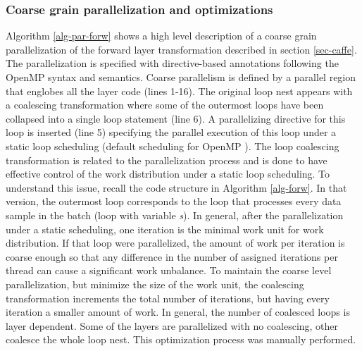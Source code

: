 \subsubsection{Coarse grain parallelization and optimizations}
Algorithm \ref{alg-par-forw} shows a high level description of a 
coarse grain parallelization of the forward layer transformation 
described in section \ref{sec-caffe}. The parallelization is specified 
with directive-based annotations following the OpenMP syntax and semantics. 
Coarse parallelism is defined by a parallel region that englobes all the 
layer code (lines 1-16). The original loop nest appears with a coalescing 
transformation where some of the outermost loops have been collapsed into a 
single loop statement (line 6). A parallelizing directive for this loop 
is inserted (line 5) specifying the parallel execution of this loop 
under a static loop scheduling (default scheduling for OpenMP \cite{Open-MP}). 
The loop coalescing transformation is related to the parallelization 
process and is done to have effective control of the work distribution 
under a static loop scheduling. To understand this issue, recall the 
code structure in Algorithm \ref{alg-forw}. In that version, the outermost 
loop corresponds to the loop that processes every data sample in the 
batch (loop with variable \emph{s}). In general, after the 
parallelization under a static scheduling, one iteration is the minimal 
work unit for work distribution. If that loop were parallelized, the 
amount of work per iteration is coarse enough so that any difference 
in the number of assigned iterations per thread can cause a significant  
work unbalance. To maintain the coarse level parallelization, but minimize 
the size of the work unit, the coalescing transformation increments the 
total number of iterations, but having every iteration a smaller 
amount of work. In general, the number of coalesced loops is layer 
dependent. Some of the layers are parallelized with no coalescing, 
other coalesce the whole loop nest. This optimization process was 
manually performed.

